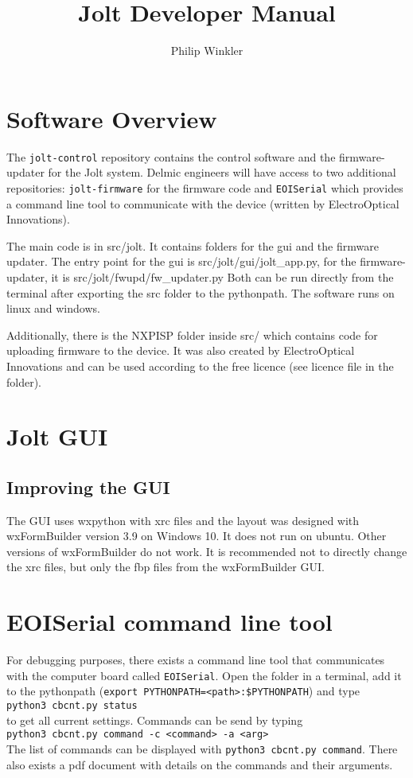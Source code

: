 \documentclass[]{article}
\title{Jolt Developer Manual}
\author{Philip Winkler}
\begin{document}
\maketitle

\section{Software Overview}
The \texttt{jolt-control} repository contains the control software and the firmware-updater for the Jolt system. Delmic engineers will have access to two additional repositories: \texttt{jolt-firmware} for the firmware code and \texttt{EOISerial} which provides a command line tool to communicate with the device (written by ElectroOptical Innovations).

The main code is in src/jolt. It contains folders for the gui and the firmware updater. The entry point for the gui is src/jolt/gui/jolt\_app.py, for the firmware-updater, it is src/jolt/fwupd/fw\_updater.py Both can be run directly from the terminal after exporting the src folder to the pythonpath. The software runs on linux and windows.

Additionally, there is the NXPISP folder inside src/ which contains code for uploading firmware to the device. It was also created by ElectroOptical Innovations and can be used according to the free licence (see licence file in the folder).

\section{Jolt GUI}
\subsection{Improving the GUI}
The GUI uses wxpython with xrc files and the layout was designed with wxFormBuilder version 3.9 on Windows 10. It does not run on ubuntu. Other versions of wxFormBuilder do not work. It is recommended not to directly change the xrc files, but only the fbp files from the wxFormBuilder GUI.

\section{EOISerial command line tool}
For debugging purposes, there exists a command line tool that communicates with the computer board called \texttt{EOISerial}. Open the folder in a terminal, add it to the pythonpath (\texttt{export PYTHONPATH=<path>:\$PYTHONPATH}) and type \\ \texttt{python3 cbcnt.py status} \\to get all current settings. Commands can be send by typing \\ \texttt{python3 cbcnt.py command -c <command> -a <arg>} \\ The list of commands can be displayed with \texttt{python3 cbcnt.py command}. There also exists a pdf document with details on the commands and their arguments.
\end{document}

